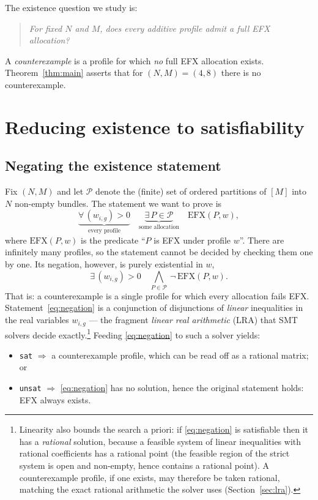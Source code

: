 \documentclass[11pt,a4paper]{article}
\theoremstyle{definition}
\theoremstyle{plain}
\newcommand{\EFX}{\textsf{EFX}}
\newcommand{\agents}{N}
\newcommand{\goods}{M}
\begin{document}
The existence question we study is:

\begin{quote}
\emph{For fixed $\agents$ and $\goods$, does every additive profile admit a full
\EFX{} allocation?}
\end{quote}

A \emph{counterexample} is a profile for which \emph{no} full \EFX{} allocation
exists. Theorem~\ref{thm:main} asserts that for $(\agents,\goods)=(4,8)$ there is
no counterexample.

\section{Reducing existence to satisfiability}
\label{sec:reduction}

\subsection{Negating the existence statement}

Fix $(\agents,\goods)$ and let $\mathcal{P}$ denote the (finite) set of ordered
partitions of $[\goods]$ into $\agents$ non-empty bundles. The statement we want
to prove is
\[
  \underbrace{\forall\, (w_{i,g})>0}_{\text{every profile}}\quad
  \underbrace{\exists\, P\in\mathcal{P}}_{\text{some allocation}}\quad
  \mathrm{EFX}(P,w),
\]
where $\mathrm{EFX}(P,w)$ is the predicate ``$P$ is \EFX{} under profile $w$''.
There are infinitely many profiles, so the statement cannot be decided by checking
them one by one. Its negation, however, is purely existential in
$w$,
\[
  \exists\, (w_{i,g})>0\quad
  \bigwedge_{P\in\mathcal{P}}\ \neg\,\mathrm{EFX}(P,w).
\tag{$\star$}
\label{eq:negation}
\]
That is: a counterexample is a single profile for which every allocation fails
\EFX. Statement~\eqref{eq:negation} is a conjunction of disjunctions of
\emph{linear} inequalities in the real variables $w_{i,g}$ --- the fragment
\emph{linear real arithmetic} (LRA) that SMT solvers decide
exactly.\footnote{Linearity also bounds the search a priori: if
\eqref{eq:negation} is satisfiable then it has a \emph{rational} solution, because
a feasible system of linear inequalities with rational coefficients has a rational
point (the feasible region of the strict system is open and non-empty, hence
contains a rational point). A counterexample profile, if one exists, may therefore
be taken rational, matching the exact rational arithmetic the solver uses
(Section~\ref{sec:lra}).} Feeding \eqref{eq:negation} to such a solver yields:
\begin{itemize}
  \item \texttt{sat} $\Rightarrow$ a counterexample profile, which can be read off
        as a rational matrix; or
  \item \texttt{unsat} $\Rightarrow$ \eqref{eq:negation} has no solution, hence the
        original statement holds: \EFX{} always exists.
\end{itemize}
\end{document}
